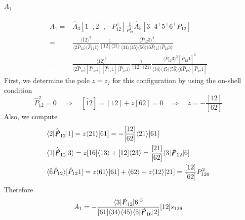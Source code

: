 \paragraph{$A_1$}
\begin{equation*}
\begin{split}
A_1 = & \hat{A}_3[1^-,2^-, -P_{12}^+]\frac{1}{P_{12}^2}\hat{A}_5[3^-4^+5^+6^+ P_{12}^-]
\\
= &\frac{\langle \hat{1}2\rangle^3}{\langle 2\hat{P}_{12}\rangle\langle \hat{P}_{12} 1\rangle}
\frac{1}{[12]\langle 21\rangle}
\frac{\langle \hat{P}_{12} 3\rangle^4}{\langle 34\rangle\langle 45\rangle\langle 5\hat{6}\rangle\langle 6\hat{P}_{12}\rangle\langle \hat{P}_{12} 3\rangle}
\\
=&
\frac{\langle \hat{1}2\rangle^3}{\langle 2\hat{P}_{12}\rangle[\hat{P}_{12} 1][\hat{P}_{12} 1]\langle \hat{P}_{12} 1\rangle}
\frac{1}{[12]\langle 21\rangle}
\frac{\langle \hat{P}_{12} 3\rangle^3[\hat{P}_{12} 1]^3}{\langle 34\rangle\langle 45\rangle\langle 5\hat{6}\rangle\langle 6\hat{P}_{12}\rangle[\hat{P}_{12} 1]}
\end{split}
\end{equation*}
First, we determine the pole $z=z_I$ for this configuration by using the on-shell condition 
\begin{equation*}
\hat{P}_{12}^2 = 0
\quad\Rightarrow\quad
[\hat{1}2] =  [12] + z[62] = 0
\quad\Rightarrow\quad
z= -\frac{[12]}{[62]}
\end{equation*}
Also, we compute
\begin{equation*}
\begin{split}
& \langle 2 |\hat{\slashed{P}}_{12}|1] = z\langle 21\rangle[61] = -\frac{[12]}{[62]}\langle 21 \rangle[61]
\\
&
\langle 1 |\hat{\slashed{P}}_{12}|3\rangle = 
z[16]\langle 13 \rangle + [12]\langle 23 \rangle
=\frac{[21]}{[62]}\langle 3 |\slashed{P}_{12}|6]
\\
&
\langle \hat{6}\hat{P}_{12}\rangle[\hat{P}_{12}1] = z\langle 61 \rangle[61] + \langle 62\rangle - z\langle 12\rangle[21]
=
\frac{[12]}{[62]}P_{126}^2
\end{split}
\end{equation*}
Therefore
\begin{equation*}
A_1 = -\frac{\langle 3 |\slashed{P}_{12}|6]^3}{[61]\langle 34\rangle \langle 45\rangle\langle 5|\slashed{P}_{16}|2]}[12]s_{126}
\end{equation*}
%
%
